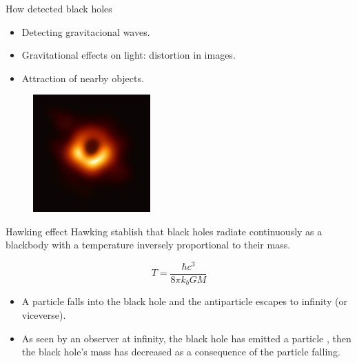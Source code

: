 \documentclass[xcolor=dvipsnames]{beamer}
\begin{document}
\begin{frame}{How detected black holes}
\begin{itemize}
    \item Detecting gravitacional waves.
    \item Gravitational effects on light: distortion in images.
    \item Attraction of nearby objects.
    
\end{itemize}
\begin{figure}
    \centering
    \includegraphics[width=0.4\textwidth]{Presentations/Images/bh.jpg}
\end{figure}
\end{frame}

\begin{frame}{Hawking effect}
Hawking stablish that black holes radiate
continuously as a blackbody with a temperature inversely proportional to their mass.

\begin{equation}
    T=\frac{\hbar c^3}{8\pi k_b G M}
\end{equation}
\begin{itemize}
    \item A particle falls into the black hole and the antiparticle escapes to infinity (or viceverse).
    \item As seen by an observer at infinity, the black hole has emitted a particle , then the black hole’s mass has decreased as a consequence of the particle falling.\textbf{}
\end{itemize}
\end{frame}
\end{document}
